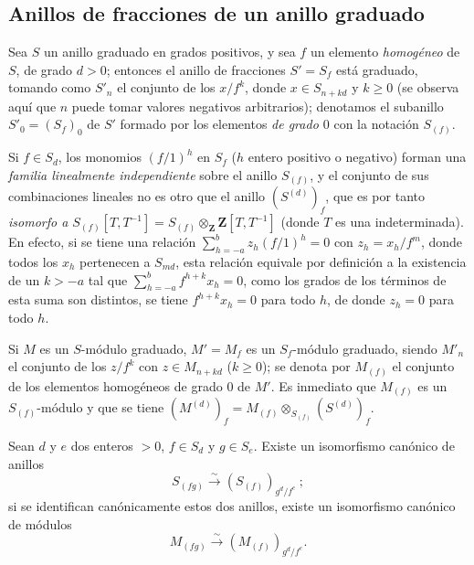 \documentclass[oneside,10pt]{amsart}
\renewcommand{\geq}{\geqslant}
\newcommand{\oldpage}[2][]{\marginnote{\normalfont\footnotesize\textbf{#1}~|~#2}\ignorespaces}
\let\EGAOriginalLabel\label
\renewcommand{\label}[1]{\phantomsection\EGAOriginalLabel{#1}}
\begin{document}
\subsection{Anillos de fracciones de un anillo graduado}
\label{subsection:II.2.2-fr}

\begin{env}[2.2.1]
\label{II.2.2.1-fr}
Sea $S$ un anillo graduado en grados positivos, y sea $f$ un elemento \emph{homogéneo} de $S$, de grado $d>0$; entonces el anillo de fracciones $S'=S_f$ está graduado, tomando como $S'_n$ el conjunto de los $x/f^k$, donde $x\in S_{n+kd}$ y $k\geq 0$ (se observa aquí que $n$ puede tomar valores negativos arbitrarios); denotamos el subanillo $S'_0=(S_f)_0$ de $S'$ formado por los elementos \emph{de grado $0$} con la notación $S_{(f)}$.

Si $f\in S_d$, los monomios $(f/1)^h$ en $S_f$ ($h$ entero positivo o negativo) forman una \emph{familia linealmente independiente} sobre el anillo $S_{(f)}$, y el conjunto de sus combinaciones lineales no es otro que
\oldpage[II]{24}
el anillo $(S^{(d)})_f$, que es por tanto \emph{isomorfo a $S_{(f)}[T,T^{-1}]=S_{(f)}\otimes_{\mathbf{Z}}\mathbf{Z}[T,T^{-1}]$} (donde $T$ es una indeterminada).
En efecto, si se tiene una relación
$\sum_{h=-a}^{b}z_h(f/1)^h=0$
con $z_h=x_h/f^m$, donde todos los $x_h$ pertenecen a $S_{md}$, esta relación equivale por definición a la existencia de un $k>-a$ tal que
$\sum_{h=-a}^{b}f^{h+k}x_h=0$,
como los grados de los términos de esta suma son distintos, se tiene $f^{h+k}x_h=0$ para todo $h$, de donde $z_h=0$ para todo $h$.

Si $M$ es un $S$-módulo graduado, $M'=M_f$ es un $S_f$-módulo graduado, siendo $M'_n$ el conjunto de los $z/f^k$ con $z\in M_{n+kd}$ ($k\geq 0$); se denota por $M_{(f)}$ el conjunto de los elementos homogéneos de grado $0$ de $M'$.
Es inmediato que $M_{(f)}$ es un $S_{(f)}$-módulo y que se tiene
$(M^{(d)})_f=M_{(f)}\otimes_{S_{(f)}}(S^{(d)})_f$.
\end{env}

\begin{lemma}[2.2.2]
\label{II.2.2.2-fr}
Sean $d$ y $e$ dos enteros $>0$, $f\in S_d$ y $g\in S_e$.
Existe un isomorfismo canónico de anillos
\[
  S_{(fg)}\xrightarrow{\sim}(S_{(f)})_{g^d/f^e}~;
\]
si se identifican canónicamente estos dos anillos, existe un isomorfismo canónico de módulos
\[
  M_{(fg)}\xrightarrow{\sim}(M_{(f)})_{g^d/f^e}.
\]
\end{lemma}
\end{document}
